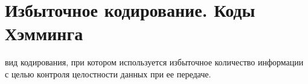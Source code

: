 \documentclass[discrete.tex]{subfiles}
\begin{document}
\newpage
\section{Избыточное кодирование. Коды Хэмминга}

\begin{definition}
    вид кодирования, при котором используется избыточное количество информации 
    с целью контроля целостности данных при ее передаче.
\end{definition}



\newpage
\end{document}
